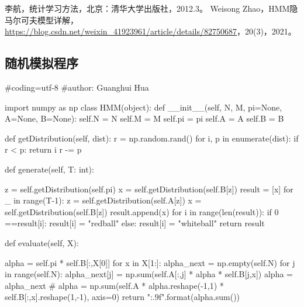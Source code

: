 \documentclass[a4paper,12pt]{ctexart}     %
\begin{document}
	\begin{thebibliography}{99}    %
		李航，统计学习方法，北京：清华大学出版社，2012.3。     
		 Weisong Zhao，HMM隐马尔可夫模型详解，\url{https://blog.csdn.net/weixin_41923961/article/details/82750687}，20(3)，2021。
		
		
		
		
	\end{thebibliography}

	
	
	
	
	\begin{appendix}

	\begin{center}
		\section{}
	\end{center}

	
	\subsection{随机模拟程序}
	\begin{python}
#coding=utf-8
#author: Guanghui Hua

import numpy as np
class HMM(object):
	def __init__(self, N, M, pi=None, A=None, B=None):
		self.N = N
		self.M = M
		self.pi = pi
		self.A = A
		self.B = B
	
	def getDistribution(self, dist): 
		r = np.random.rand()  
		for i, p in enumerate(dist):
			if r < p: return i
			r -= p
	
	def generate(self, T: int):
	
		z = self.getDistribution(self.pi)    
		x = self.getDistribution(self.B[z])  
		result = [x]
		for _ in range(T-1):        
			z = self.getDistribution(self.A[z])
			x = self.getDistribution(self.B[z])
			result.append(x)
		for i in range(len(result)):
			if 0 ==result[i]:
			result[i] = "redball"
			else:
			result[i] = "whiteball"
		return result
	
	def evaluate(self, X):
	
		alpha = self.pi * self.B[:,X[0]]
		for x in X[1:]:
			alpha_next = np.empty(self.N)
		for j in range(self.N):
			alpha_next[j] = np.sum(self.A[:,j] * alpha * self.B[j,x])
		alpha = alpha_next
		# alpha = np.sum(self.A * alpha.reshape(-1,1) * self.B[:,x].reshape(1,-1), axis=0)
		return "{:.9f}".format(alpha.sum())
		

\end{python}
\end{appendix}
\end{document}
